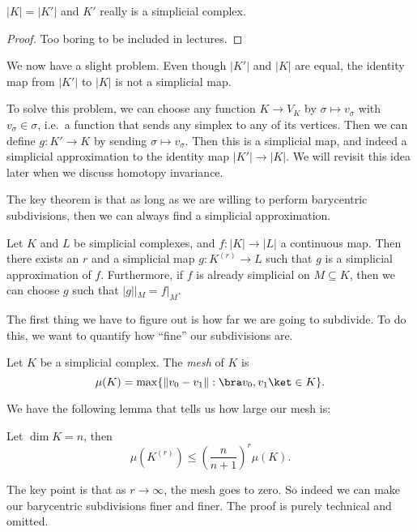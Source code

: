\documentclass[a4paper]{article}
\begin{document}
\begin{prop}
  $|K| = |K'|$ and $K'$ really is a simplicial complex.
\end{prop}

\begin{proof}
  Too boring to be included in lectures.
\end{proof}

We now have a slight problem. Even though $|K'|$ and $|K|$ are equal, the identity map from $|K'|$ to $|K|$ is not a simplicial map.

To solve this problem, we can choose any function $K \to V_K$ by $\sigma \mapsto v_\sigma$ with $v_\sigma \in \sigma$, i.e.\ a function that sends any simplex to any of its vertices. Then we can define $g: K' \to K$ by sending $\hat{\sigma} \mapsto v_\sigma$. Then this is a simplicial map, and indeed a simplicial approximation to the identity map $|K'| \to |K|$. We will revisit this idea later when we discuss homotopy invariance.

The key theorem is that as long as we are willing to perform barycentric subdivisions, then we can always find a simplicial approximation.

\begin{thm}
  Let $K$ and $L$ be simplicial complexes, and $f: |K| \to |L|$ a continuous map. Then there exists an $r$ and a simplicial map $g: K^{(r)} \to L$ such that $g$ is a simplicial approximation of $f$. Furthermore, if $f$ is already simplicial on $M\subseteq K$, then we can choose $g$ such that $|g||_M = f|_M$.
\end{thm}

The first thing we have to figure out is how far we are going to subdivide. To do this, we want to quantify how ``fine'' our subdivisions are.
\begin{defi}[Mesh]
  Let $K$ be a simplicial complex. The \emph{mesh} of $K$ is
  \[
    \mu(K) = \max\{\|v_0 - v_1\| : \bra v_0, v_1\ket \in K\}.
  \]
\end{defi}

We have the following lemma that tells us how large our mesh is:
\begin{lemma}
  Let $\dim K = n$, then
  \[
    \mu(K^{(r)}) \leq \left(\frac{n}{n + 1}\right)^r \mu(K).
  \]
\end{lemma} %
The key point is that as $r \to \infty$, the mesh goes to zero. So indeed we can make our barycentric subdivisions finer and finer. The proof is purely technical and omitted.
\end{document}
